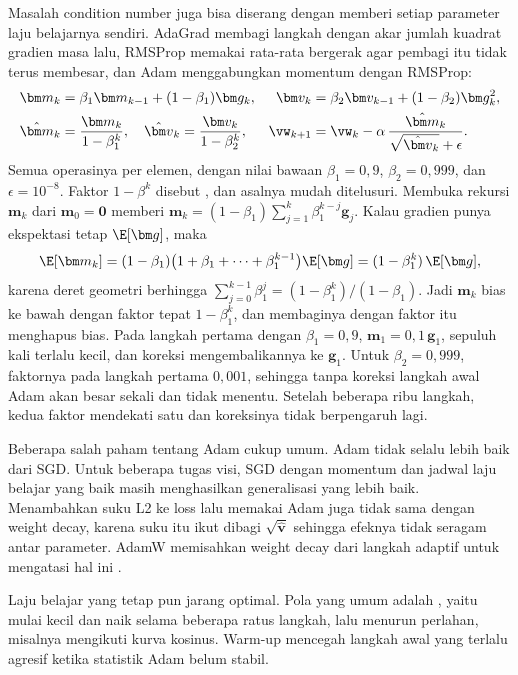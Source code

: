 Masalah condition number juga bisa diserang dengan memberi setiap parameter laju belajarnya
sendiri. AdaGrad membagi langkah dengan akar jumlah kuadrat gradien masa lalu, RMSProp memakai
rata-rata bergerak agar pembagi itu tidak terus membesar, dan Adam \citep{kingma2015}
menggabungkan momentum dengan RMSProp:
\begin{equation}
\begin{aligned}
\bm m_k &= \beta_1\bm m_{k-1}+(1-\beta_1)\bm g_k, &
\bm v_k &= \beta_2\bm v_{k-1}+(1-\beta_2)\bm g_k^2,\\
\hat{\bm m}_k &= \frac{\bm m_k}{1-\beta_1^k},\quad \hat{\bm v}_k=\frac{\bm v_k}{1-\beta_2^k}, &
\vw_{k+1} &= \vw_k-\alpha\,\frac{\hat{\bm m}_k}{\sqrt{\hat{\bm v}_k}+\epsilon}.
\end{aligned}
\end{equation}
Semua operasinya per elemen, dengan nilai bawaan $\beta_1=0{,}9$, $\beta_2=0{,}999$, dan
$\epsilon=10^{-8}$. Faktor $1-\beta^k$ disebut , dan asalnya mudah ditelusuri.
Membuka rekursi $\bm m_k$ dari $\bm m_0=\bm0$ memberi
$\bm m_k=(1-\beta_1)\sum_{j=1}^k\beta_1^{k-j}\bm g_j$. Kalau gradien punya ekspektasi tetap
$\E[\bm g]$, maka
\[
\E[\bm m_k]=(1-\beta_1)\big(1+\beta_1+\cdots+\beta_1^{k-1}\big)\E[\bm g]=(1-\beta_1^k)\,\E[\bm g],
\]
karena deret geometri berhingga $\sum_{j=0}^{k-1}\beta_1^j=(1-\beta_1^k)/(1-\beta_1)$. Jadi $\bm m_k$ bias ke
bawah dengan faktor tepat $1-\beta_1^k$, dan membaginya dengan faktor itu menghapus bias. Pada langkah
pertama dengan $\beta_1=0{,}9$, $\bm m_1=0{,}1\,\bm g_1$, sepuluh kali terlalu kecil, dan koreksi
mengembalikannya ke $\bm g_1$. Untuk $\beta_2=0{,}999$, faktornya pada langkah pertama $0{,}001$, sehingga
tanpa koreksi langkah awal Adam akan besar sekali dan tidak menentu. Setelah beberapa ribu langkah,
kedua faktor mendekati satu dan koreksinya tidak berpengaruh lagi.

Beberapa salah paham tentang Adam cukup umum. Adam tidak selalu lebih baik dari SGD. Untuk
beberapa tugas visi, SGD dengan momentum dan jadwal laju belajar yang baik masih menghasilkan
generalisasi yang lebih baik. Menambahkan suku L2 ke loss lalu memakai Adam juga tidak sama
dengan weight decay, karena suku itu ikut dibagi $\sqrt{\hat{\bm v}}$ sehingga efeknya tidak
seragam antar parameter. AdamW memisahkan weight decay dari langkah adaptif untuk mengatasi hal
ini \citep{loshchilov2019}.

Laju belajar yang tetap pun jarang optimal. Pola yang umum adalah , yaitu mulai
kecil dan naik selama beberapa ratus langkah, lalu menurun perlahan, misalnya mengikuti kurva
kosinus. Warm-up mencegah langkah awal yang terlalu agresif ketika statistik Adam belum stabil.

